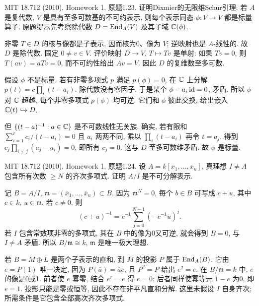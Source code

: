 \begin{exercise}\label{hw:1.23}
MIT 18.712 (2010), Homework 1, 原题1.23. 证明Dixmier的无限维Schur引理: 若 $A$ 是复代数, $V$ 是具有至多可数基的不可约表示, 则每个表示同态 $\phi:V\to V$ 都是标量算子. 原题提示先考察除代数 $D=\operatorname{End}_A(V)$ 及其子域 $\mathbb C(\phi)$.
\end{exercise}
\begin{solution}
非零 $T\in D$ 的核与像都是子表示, 因而核为0、像为 $V$; 逆映射也是 $A$-线性的. 故 $D$ 是除代数. 固定 $0\ne v\in V$. 评价映射 $D\to V$, $T\mapsto Tv$ 是单射: 如果 $Tv=0$, 则 $T(av)=aTv=0$, 而不可约性给出 $Av=V$. 因此 $D$ 的复维数至多可数.

假设 $\phi$ 不是标量. 若有非零多项式 $p$ 满足 $p(\phi)=0$, 在 $\mathbb C$ 上分解 $p(t)=c\prod_i(t-a_i)$. 除代数没有零因子, 于是某个 $\phi-a_i\operatorname{id}=0$, 矛盾. 所以 $\phi$ 对 $\mathbb C$ 超越, 每个非零多项式 $p(\phi)$ 均可逆. 它们和 $\phi$ 彼此交换, 给出嵌入 $\mathbb C(t)\hookrightarrow D$.

但 $\{(t-a)^{-1}:a\in\mathbb C\}$ 是不可数线性无关族. 确实, 若有限和 $\sum_{i=1}^r c_i/(t-a_i)=0$ 且 $a_i$ 两两不同, 乘以 $\prod_i(t-a_i)$ 再令 $t=a_j$, 得到 $c_j\prod_{i\ne j}(a_j-a_i)=0$, 即所有 $c_j=0$. 这与 $D$ 至多可数维矛盾. 故 $\phi$ 是标量.
\end{solution}

\begin{exercise}\label{hw:1.24}
MIT 18.712 (2010), Homework 1, 原题1.24. 设 $A=k[x_1,\ldots,x_n]$, 真理想 $I\ne A$ 包含所有次数 $\ge N$ 的齐次多项式. 证明 $A/I$ 是不可分解表示.
\end{exercise}
\begin{solution}
记 $B=A/I$, $\mathfrak m=(\bar x_1,\ldots,\bar x_n)\subset B$. 因为 $\mathfrak m^N=0$, 每个 $b\in B$ 可写成 $c+u$, 其中 $c\in k$, $u\in\mathfrak m$. 若 $c\ne0$, 则
\[
(c+u)^{-1}=c^{-1}\sum_{j=0}^{N-1}(-c^{-1}u)^j.
\]
若 $I$ 包含常数项非零的多项式, 其在 $B$ 中的像为0又可逆, 就会得到 $B=0$, 与 $I\ne A$ 矛盾. 所以 $B/\mathfrak m\cong k$, $\mathfrak m$ 是唯一极大理想.

若 $B=M\oplus L$ 是两个子表示的直和, 到 $M$ 的投影 $P$ 属于 $\operatorname{End}_A(B)$. 它由 $e=P(1)$ 唯一决定, 因为 $P(\bar a)=\bar a e$, 且 $P^2=P$ 给出 $e^2=e$. 在 $B/\mathfrak m=k$ 中, $e$ 的像是0或1. 前者使 $e$ 幂零, 结合 $e^r=e$ 得 $e=0$; 后者同样使幂等元 $1-e$ 为0, 即 $e=1$. 投影只能是零或恒等, 因此不存在非平凡直和分解. 这里未假设 $I$ 自身齐次; 所需条件是它包含全部高次齐次多项式.
\end{solution}

